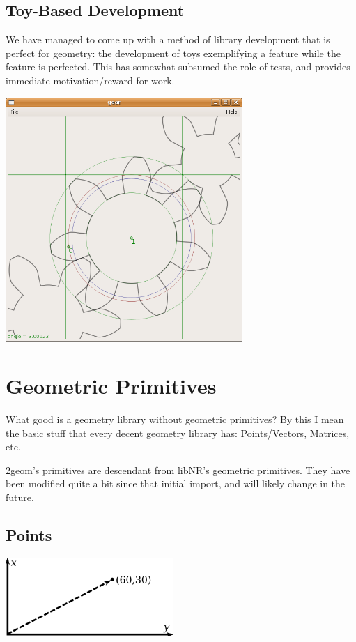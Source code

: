 \documentclass[openany]{book}
\begin{document}
\section{Toy-Based Development}
We have managed to come up with a method of library development
that is perfect for geometry: the development of toys exemplifying
a feature while the feature is perfected.  This has somewhat subsumed
the role of tests, and provides immediate motivation/reward for work.

\includegraphics[width=90mm]{media/gear.png}

\chapter{Geometric Primitives}

What good is a geometry library without geometric primitives?  By this
I mean the basic stuff that every decent geometry library has:
Points/Vectors, Matrices, etc.

2geom's primitives are descendant from libNR's geometric primitives.
They have been modified quite a bit since that initial import, and
will likely change in the future.

\section{Points}

\includegraphics[height=30mm]{media/point.png}
\end{document}
